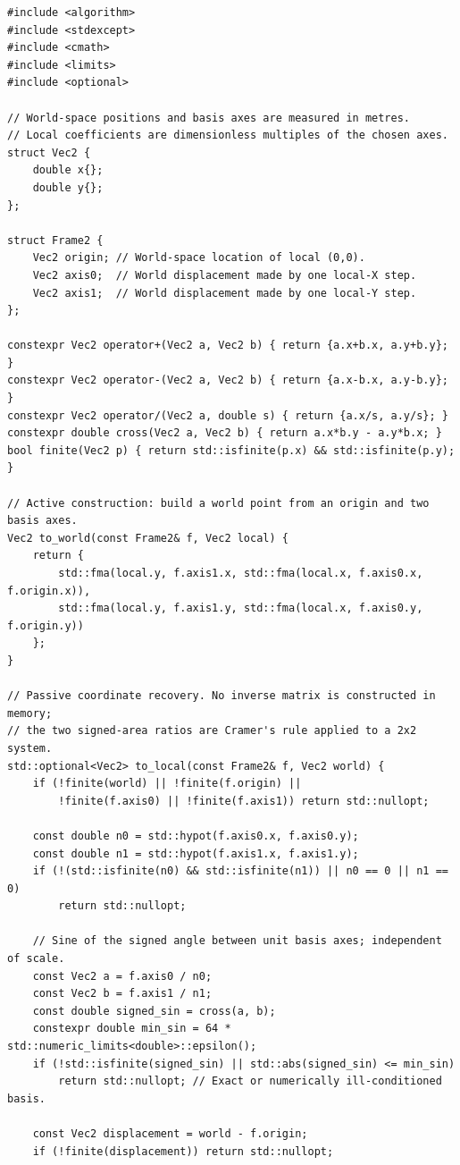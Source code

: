 \begin{verbatim}
#include <algorithm>
#include <stdexcept>
#include <cmath>
#include <limits>
#include <optional>

// World-space positions and basis axes are measured in metres.
// Local coefficients are dimensionless multiples of the chosen axes.
struct Vec2 {
    double x{};
    double y{};
};

struct Frame2 {
    Vec2 origin; // World-space location of local (0,0).
    Vec2 axis0;  // World displacement made by one local-X step.
    Vec2 axis1;  // World displacement made by one local-Y step.
};

constexpr Vec2 operator+(Vec2 a, Vec2 b) { return {a.x+b.x, a.y+b.y}; }
constexpr Vec2 operator-(Vec2 a, Vec2 b) { return {a.x-b.x, a.y-b.y}; }
constexpr Vec2 operator/(Vec2 a, double s) { return {a.x/s, a.y/s}; }
constexpr double cross(Vec2 a, Vec2 b) { return a.x*b.y - a.y*b.x; }
bool finite(Vec2 p) { return std::isfinite(p.x) && std::isfinite(p.y); }

// Active construction: build a world point from an origin and two basis axes.
Vec2 to_world(const Frame2& f, Vec2 local) {
    return {
        std::fma(local.y, f.axis1.x, std::fma(local.x, f.axis0.x, f.origin.x)),
        std::fma(local.y, f.axis1.y, std::fma(local.x, f.axis0.y, f.origin.y))
    };
}

// Passive coordinate recovery. No inverse matrix is constructed in memory;
// the two signed-area ratios are Cramer's rule applied to a 2x2 system.
std::optional<Vec2> to_local(const Frame2& f, Vec2 world) {
    if (!finite(world) || !finite(f.origin) ||
        !finite(f.axis0) || !finite(f.axis1)) return std::nullopt;

    const double n0 = std::hypot(f.axis0.x, f.axis0.y);
    const double n1 = std::hypot(f.axis1.x, f.axis1.y);
    if (!(std::isfinite(n0) && std::isfinite(n1)) || n0 == 0 || n1 == 0)
        return std::nullopt;

    // Sine of the signed angle between unit basis axes; independent of scale.
    const Vec2 a = f.axis0 / n0;
    const Vec2 b = f.axis1 / n1;
    const double signed_sin = cross(a, b);
    constexpr double min_sin = 64 * std::numeric_limits<double>::epsilon();
    if (!std::isfinite(signed_sin) || std::abs(signed_sin) <= min_sin)
        return std::nullopt; // Exact or numerically ill-conditioned basis.

    const Vec2 displacement = world - f.origin;
    if (!finite(displacement)) return std::nullopt;


\end{verbatim}
